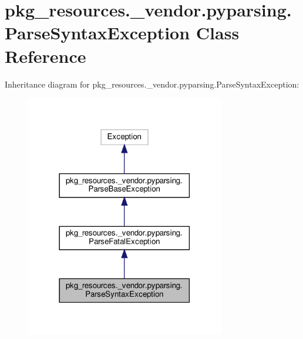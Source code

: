 \hypertarget{classpkg__resources_1_1__vendor_1_1pyparsing_1_1ParseSyntaxException}{}\section{pkg\+\_\+resources.\+\_\+vendor.\+pyparsing.\+Parse\+Syntax\+Exception Class Reference}
\label{classpkg__resources_1_1__vendor_1_1pyparsing_1_1ParseSyntaxException}


Inheritance diagram for pkg\+\_\+resources.\+\_\+vendor.\+pyparsing.\+Parse\+Syntax\+Exception\+:
\nopagebreak
\begin{figure}[H]
\begin{center}
\leavevmode
\includegraphics[width=246pt]{classpkg__resources_1_1__vendor_1_1pyparsing_1_1ParseSyntaxException__inherit__graph}
\end{center}
\end{figure}


